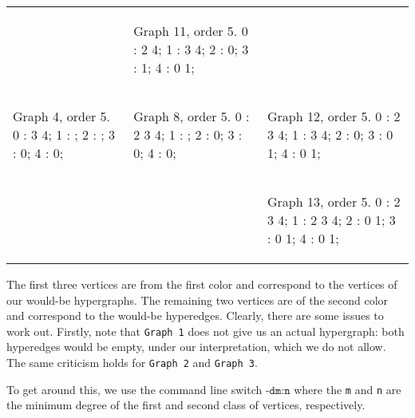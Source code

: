 \begin{tabular}{|p{1.5in} | p{1.5in} | p{1.5in} |}
\begin{minipage}{1.5in}
\begin{output}
\end{output}
\end{minipage}
&
\begin{minipage}{1.5in}
\begin{output}
Graph 11, order 5.
0 : 2 4;
1 : 3 4;
2 : 0;
3 : 1;
4 : 0 1;

\end{output}
\end{minipage}
\\
\begin{minipage}{1.5in}
\begin{output}
Graph 4, order 5.
0 : 3 4;
1 : ;
2 : ;
3 : 0;
4 : 0;

\end{output}
\end{minipage}
&
\begin{minipage}{1.5in}
\begin{output}
Graph 8, order 5.
0 : 2 3 4;
1 : ;
2 : 0;
3 : 0;
4 : 0;

\end{output}
\end{minipage}
&
\begin{minipage}{1.5in}
\begin{output}
Graph 12, order 5.
0 : 2 3 4;
1 : 3 4;
2 : 0;
3 : 0 1;
4 : 0 1;

\end{output}
\end{minipage}
\\
&
&
\begin{minipage}{1.5in}
\begin{output}
Graph 13, order 5.
0 : 2 3 4;
1 : 2 3 4;
2 : 0 1;
3 : 0 1;
4 : 0 1;

\end{output}
\end{minipage}
\\
\end{tabular}


The first three vertices are from the first color and correspond to the vertices of our would-be hypergraphs.
The remaining two vertices are of the second color and correspond to the would-be hyperedges.
Clearly, there are some issues to work out. Firstly, note that \texttt{Graph 1} does not give us an actual hypergraph: both hyperedges would be empty, under our interpretation, which we do not allow. The same criticism holds for \texttt{Graph 2} and \texttt{Graph 3}.

To get around this, we use the command line switch $\texttt{-dm:n}$ where the \texttt{m} and \texttt{n} are the minimum degree of the first and second class of vertices, respectively.

